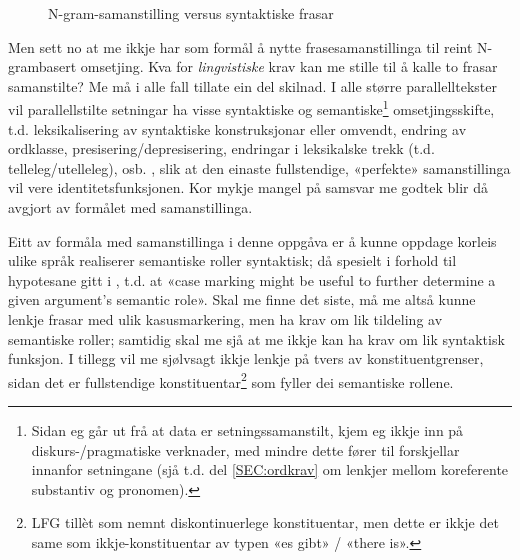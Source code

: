 \documentclass[11pt,a4paper,oneside,draft]{book}
\begin{document}
\begin{figure}[htp]
   \centering
   \caption{N-gram-samanstilling versus syntaktiske frasar}
    \label{fig:ikkjenode}
  \end{figure}

Men sett no at me ikkje har som formål å nytte frasesamanstillinga til
reint N-grambasert omsetjing. Kva for \emph{lingvistiske} krav kan me
stille til å kalle to frasar samanstilte? Me må i alle fall tillate
ein del skilnad.  I alle større parallelltekster vil parallellstilte
setningar ha visse syntaktiske og semantiske\footnote{Sidan eg går ut frå at data er setningssamanstilt, kjem eg
       ikkje inn på diskurs-/pragmatiske verknader, med mindre dette
       fører til forskjellar innanfor setningane (sjå t.d. del
       \ref{SEC:ordkrav} om lenkjer mellom koreferente substantiv og
       pronomen). } omsetjingsskifte,
t.d. leksikalisering av syntaktiske konstruksjonar eller omvendt,
endring av ordklasse, presisering/depresisering, endringar i leksikalske
trekk (t.d. telleleg/utelleleg),
osb. \citep[s.~56--62]{munday2001its}, slik at den einaste
fullstendige, «perfekte» samanstillinga vil vere
identitetsfunksjonen. Kor mykje mangel på samsvar me godtek blir då
avgjort av formålet med samanstillinga.

Eitt av formåla med samanstillinga i denne oppgåva er å kunne oppdage
korleis ulike språk realiserer semantiske roller syntaktisk; då
spesielt i forhold til hypotesane gitt i \citet[s.~7]{xpar2008rcn},
t.d. at «case marking might be useful to further determine a given
argument's semantic role». Skal me finne det siste, må me altså kunne
lenkje frasar med ulik kasusmarkering, men ha krav om lik tildeling av
semantiske roller; samtidig skal me sjå at me ikkje kan ha krav om lik
syntaktisk funksjon. I tillegg vil me sjølvsagt ikkje lenkje på tvers
av konstituentgrenser, sidan det er fullstendige konstituentar\footnote{LFG tillèt som nemnt diskontinuerlege konstituentar, men dette
        er ikkje det same som ikkje-konstituentar av typen «es gibt» /
        «there is». }
som fyller dei semantiske rollene.
\end{document}
